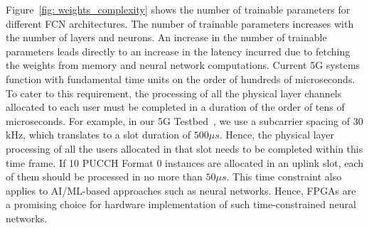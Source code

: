 \documentclass[journal]{IEEEtran}
\begin{document}


 


Figure~\ref{fig: weights_complexity} shows the number of trainable parameters for different FCN architectures. The number of trainable parameters increases with the number of layers and neurons. An increase in the number of trainable parameters leads directly to an increase in the latency incurred due to fetching the weights from memory and neural network computations. Current 5G systems function with fundamental time units on the order of hundreds of microseconds. To cater to this requirement, the processing of all the physical layer channels allocated to each user must be completed in a duration of the order of tens of microseconds. For example, in our 5G Testbed~\cite{5gtbiitm}, we use a subcarrier spacing of $30$kHz, which translates to a slot duration of $500\mu s$. Hence, the physical layer processing of all the users allocated in that slot needs to be completed within this time frame. If 10 PUCCH Format 0 instances are allocated in an uplink slot, each of them should be processed in no more than $50\mu s$. This time constraint also applies to AI/ML-based approaches such as neural networks. Hence, FPGAs are a promising choice for hardware implementation of such time-constrained neural networks.
\end{document}
